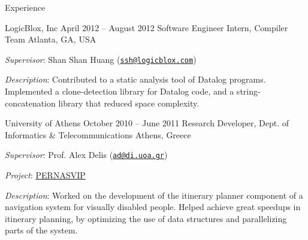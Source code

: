 \documentclass{resume}
\begin{document}
\begin{rSection}{Experience}
\begin{rSubsection}{LogicBlox, Inc}
  {April 2012 -- August 2012}
  {Software Engineer Intern, Compiler Team}
  {Atlanta, GA, USA}
\item \emph{Supervisor}: Shan Shan Huang
  (\href{mailto:ssh@logicblox.com}{\nolinkurl{ssh@logicblox.com}})
\item \emph{Description}: Contributed to a static analysis tool of
  Datalog programs. Implemented a clone-detection library for Datalog
  code, and a string-concatenation library that reduced space complexity.
\end{rSubsection}

\begin{rSubsection}
  {University of Athens}
  {October 2010 -- June 2011}
  {Research Developer, Dept. of Informatics \& Telecommunications}
  {Athens, Greece}
\item \emph{Supervisor}: Prof. Alex Delis
  (\href{mailto:ad@di.uoa.gr}{\nolinkurl{ad@di.uoa.gr}})
\item \emph{Project}: \href{http://pernasvip.di.uoa.gr/index.php}{PERNASVIP}
\item \emph{Description}: Worked on the development of the itinerary
  planner component of a navigation system for visually disabled
  people. Helped achieve great speedups in itinerary planning, by
  optimizing the use of data structures and parallelizing parts of the
  system.
\end{rSubsection}

\end{rSection}
\end{document}
